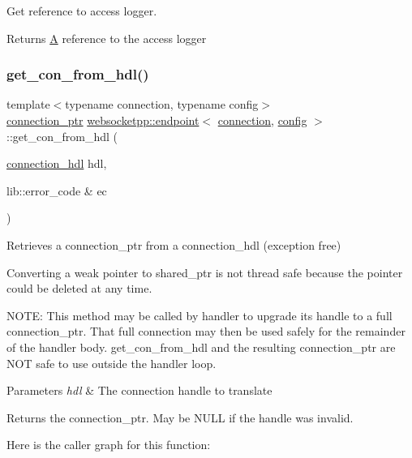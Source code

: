 Get reference to access logger. 

\begin{DoxyReturn}{Returns}
\mbox{\hyperlink{struct_a}{A}} reference to the access logger 
\end{DoxyReturn}
\mbox{\label{classwebsocketpp_1_1endpoint_a0fe4457427d4124abe7ca022ba7afbb4}} 
\subsubsection{\texorpdfstring{get\+\_\+con\+\_\+from\+\_\+hdl()}{get\_con\_from\_hdl()}}
{\footnotesize\ttfamily template$<$typename connection, typename config$>$ \\
\mbox{\hyperlink{classwebsocketpp_1_1endpoint_aa90d289d870c500be228ee1dea75b8b2}{connection\+\_\+ptr}} \mbox{\hyperlink{classwebsocketpp_1_1endpoint}{websocketpp\+::endpoint}}$<$ \mbox{\hyperlink{classwebsocketpp_1_1connection}{connection}}, \mbox{\hyperlink{classconfig}{config}} $>$\+::get\+\_\+con\+\_\+from\+\_\+hdl (\begin{DoxyParamCaption}\item[{\mbox{\hyperlink{namespacewebsocketpp_a6b3d26a10ee7229b84b776786332631d}{connection\+\_\+hdl}}}]{hdl,  }\item[{lib\+::error\+\_\+code \&}]{ec }\end{DoxyParamCaption})\hspace{0.3cm}{\ttfamily [inline]}}



Retrieves a connection\+\_\+ptr from a connection\+\_\+hdl (exception free) 

Converting a weak pointer to shared\+\_\+ptr is not thread safe because the pointer could be deleted at any time.

N\+O\+TE\+: This method may be called by handler to upgrade its handle to a full connection\+\_\+ptr. That full connection may then be used safely for the remainder of the handler body. get\+\_\+con\+\_\+from\+\_\+hdl and the resulting connection\+\_\+ptr are N\+OT safe to use outside the handler loop.


\begin{DoxyParams}{Parameters}
{\em hdl} & The connection handle to translate\\
\hline
\end{DoxyParams}
\begin{DoxyReturn}{Returns}
the connection\+\_\+ptr. May be N\+U\+LL if the handle was invalid. 
\end{DoxyReturn}
Here is the caller graph for this function\+:
\mbox{\label{classwebsocketpp_1_1endpoint_a63ed630042ce9549dfc7d9513cb19678}} 

